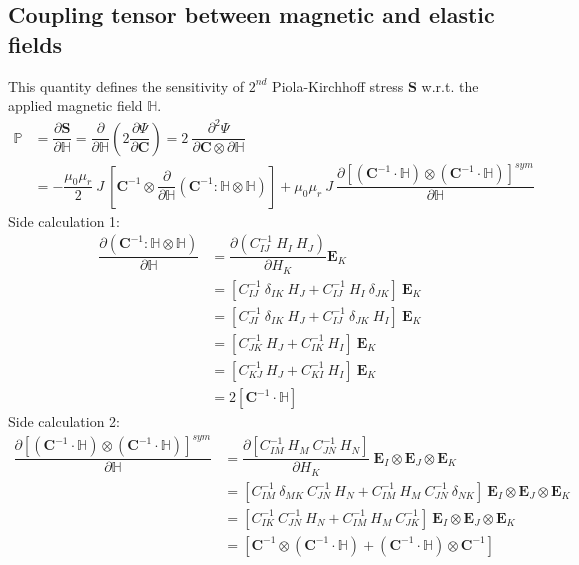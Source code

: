 \documentclass[11pt,a4paper,final]{article}
\begin{document}
\subsection{Coupling tensor between magnetic and elastic fields}
This quantity defines the sensitivity of $2^{nd}$ Piola-Kirchhoff stress $\mathbf{S}$ w.r.t. the applied magnetic field $\mathbb{H}$.
\begin{align*}
\mathbb{P} &= \dfrac{\partial \mathbf{S}}{\partial \mathbb{H}} = \dfrac{\partial}{\partial \mathbb{H}} \left( 2 \dfrac{\partial \Psi}{\partial \mathbf{C}} \right) = 2 \ \dfrac{\partial^2 \Psi}{\partial \mathbf{C} \otimes \partial \mathbb{H}}\\
&= - \dfrac{\mu_0 \mu_r}{2} \ J \ \left[ \mathbf{C}^{-1} \otimes \dfrac{\partial}{\partial \mathbb{H}} \left( \mathbf{C}^{-1} : \mathbb{H} \otimes \mathbb{H} \right) \right] + \mu_0 \mu_r \ J \ \dfrac{\partial [ (\mathbf{C}^{-1} \cdot \mathbb{H}) \otimes (\mathbf{C}^{-1} \cdot \mathbb{H}) ]^{sym}}{\partial \mathbb{H}}
\end{align*}
Side calculation 1:
\begin{align*}
\dfrac{\partial \left( \mathbf{C}^{-1} : \mathbb{H} \otimes \mathbb{H} \right)}{\partial \mathbb{H}} &= \dfrac{\partial \left( C^{-1}_{IJ} \ H_I \ H_J \right)}{\partial H_K} \mathbf{E}_K \\
&= \left[ C^{-1}_{IJ} \ \delta_{IK} \ H_J + C^{-1}_{IJ} \ H_I \ \delta_{JK} \right] \ \mathbf{E}_K \\
&= \left[ C^{-1}_{JI} \ \delta_{IK} \ H_J + C^{-1}_{IJ} \ \delta_{JK} \ H_I \right] \ \mathbf{E}_K \\
&= \left[ C^{-1}_{JK} \ H_J + C^{-1}_{IK} \ H_I \right] \ \mathbf{E}_K \\
&= \left[ C^{-1}_{KJ} \ H_J + C^{-1}_{KI} \ H_I \right] \ \mathbf{E}_K \\
&= 2 [\mathbf{C}^{-1} \cdot \mathbb{H}]
\end{align*}
Side calculation 2:
\begin{align*}
\dfrac{\partial [ (\mathbf{C}^{-1} \cdot \mathbb{H}) \otimes (\mathbf{C}^{-1} \cdot \mathbb{H}) ]^{sym}}{\partial \mathbb{H}} &= \dfrac{\partial \left[ C^{-1}_{IM} \ H_M \ C^{-1}_{JN} \ H_N \right]}{\partial H_K} \ \mathbf{E}_I \otimes \mathbf{E}_J \otimes \mathbf{E}_K \\
&= \left[ C^{-1}_{IM} \ \delta_{MK} \ C^{-1}_{JN} \ H_N + C^{-1}_{IM} \ H_M \ C^{-1}_{JN} \ \delta_{NK} \right] \ \mathbf{E}_I \otimes \mathbf{E}_J \otimes \mathbf{E}_K \\
&= \left[ C^{-1}_{IK} \ C^{-1}_{JN} \ H_N + C^{-1}_{IM} \ H_M \ C^{-1}_{JK} \right] \ \mathbf{E}_I \otimes \mathbf{E}_J \otimes \mathbf{E}_K \\
&= \left[ \mathbf{C}^{-1} \otimes (\mathbf{C}^{-1} \cdot \mathbb{H}) + (\mathbf{C}^{-1} \cdot \mathbb{H}) \otimes \mathbf{C}^{-1} \right]
\end{align*}
\end{document}

